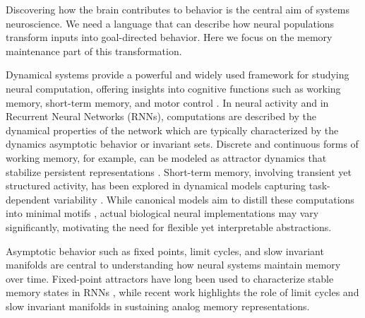 \documentclass{article}
\theoremstyle{definition} \newtheorem{definition}{Definition}  \newtheorem{example}{Example}
\theoremstyle{remark} \newtheorem{remark}{Remark}
\newcounter{ct}
\begin{document}
Discovering how the brain contributes to behavior is the central aim of systems neuroscience.
We need a language that can describe how neural populations transform inputs into goal-directed behavior.
Here we focus on the memory maintenance part of this transformation.

Dynamical systems provide a powerful and widely used framework for studying neural computation, offering insights into cognitive functions such as working memory, short-term memory, and motor control \citep{beer1995ctrnn, beer2006parameterspace, sussillo2014neural, vyas2020ctd}.
In neural activity and in Recurrent Neural Networks (RNNs), computations are described by the dynamical properties of the network which are typically characterized by the dynamics asymptotic behavior or invariant sets.
Discrete and continuous forms of working memory, for example, can be modeled as attractor dynamics that stabilize persistent representations \citep{zhang2022translation, hoeller2024bridging}.
Short-term memory, involving transient yet structured activity, has been explored in dynamical models capturing task-dependent variability \citep{kurtkaya2025dynamical}.
 While canonical models aim to distill these computations into minimal motifs \citep{chirimuuta2014minimal}, actual biological neural implementations may vary significantly, motivating the need for flexible yet interpretable abstractions.

Asymptotic behavior such as fixed points, limit cycles, and slow invariant manifolds are central to understanding how neural systems maintain memory over time.
Fixed-point attractors have long been used to characterize stable memory states in RNNs \citep{sussillo2013blackbox, katz2017fibers, golub2018fixedpointfinder}, while recent work highlights the role of limit cycles \citep{townley2000existence, pals2024inferring} and slow invariant manifolds in sustaining analog memory representations\citep{Sagodi2024a}.
\end{document}
